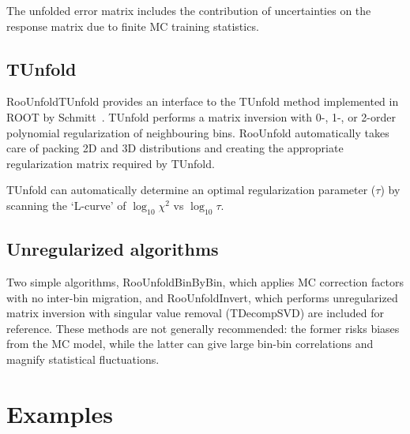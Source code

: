 \documentclass{cernrep}
\begin{document}
The unfolded error matrix includes the contribution of uncertainties on the
response matrix due to finite MC training statistics.

\subsection{TUnfold}

RooUnfoldTUnfold provides an interface to the TUnfold method implemented in ROOT by Schmitt~\cite{Schmitt-web}.
TUnfold performs a matrix inversion with 0-, 1-, or 2-order polynomial regularization of neighbouring bins.
RooUnfold automatically takes care of packing 2D and 3D distributions
and creating the appropriate regularization matrix required by TUnfold.

TUnfold can automatically determine an optimal regularization parameter ($\tau$) by scanning the
`L-curve' of $\log_{10} \chi^2$ vs $\log_{10} \tau$.

\subsection{Unregularized algorithms}

Two simple algorithms,
RooUnfoldBinByBin, which applies MC correction factors with no inter-bin migration,
and RooUnfoldInvert, which performs unregularized matrix inversion with singular value removal (TDecompSVD)
are included for reference.
These methods are not generally recommended: the former risks biases from the MC model,
while the latter can give large bin-bin correlations and magnify statistical fluctuations.

\section{Examples\label{sec:adye:examples}}
\end{document}
